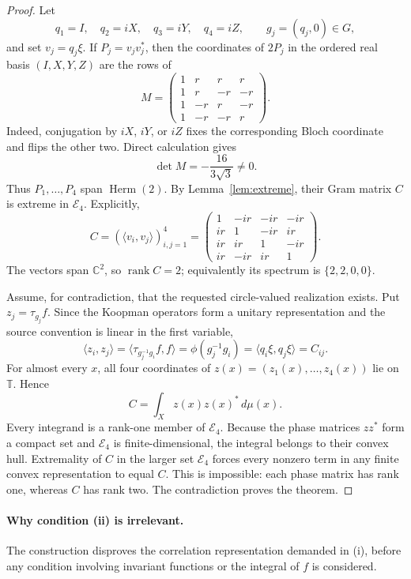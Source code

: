 \documentclass[11pt]{article}
\newcommand{\T}{\mathbb T}
\newcommand{\C}{\mathbb C}
\newcommand{\Herm}{\operatorname{Herm}}
\begin{document}
\begin{proof}
Let
\[
 q_1=I,\quad q_2=iX,\quad q_3=iY,\quad q_4=iZ,
 \qquad g_j=(q_j,0)\in G,
\]
and set $v_j=q_j\xi$.  If $P_j=v_jv_j^*$, then the coordinates of $2P_j$ in
the ordered real basis $(I,X,Y,Z)$ are the rows of
\[
 M=\begin{pmatrix}
 1&r&r&r\\
 1&r&-r&-r\\
 1&-r&r&-r\\
 1&-r&-r&r
 \end{pmatrix}.
\]
Indeed, conjugation by $iX$, $iY$, or $iZ$ fixes the corresponding Bloch
coordinate and flips the other two.  Direct calculation gives
\[
 \det M=-\frac{16}{3\sqrt3}\neq0.
\]
Thus $P_1,\dots,P_4$ span $\Herm(2)$.  By
Lemma~\ref{lem:extreme}, their Gram matrix $C$ is extreme in $\mathcal E_4$.
Explicitly,
\[
 C=(\langle v_i,v_j\rangle)_{i,j=1}^4
 =\begin{pmatrix}
 1&-ir&-ir&-ir\\
 ir&1&-ir&ir\\
 ir&ir&1&-ir\\
 ir&-ir&ir&1
 \end{pmatrix}.
\]
The vectors span $\C^2$, so $\operatorname{rank}C=2$; equivalently its
spectrum is $\{2,2,0,0\}$.

Assume, for contradiction, that the requested circle-valued realization
exists.  Put $z_j=\tau_{g_j}f$.  Since the Koopman operators form a unitary
representation and the source convention is linear in the first variable,
\[
 \langle z_i,z_j\rangle
 =\langle\tau_{g_j^{-1}g_i}f,f\rangle
 =\phi(g_j^{-1}g_i)
 =\langle q_i\xi,q_j\xi\rangle=C_{ij}.
\]
For almost every $x$, all four coordinates of
$z(x)=(z_1(x),\dots,z_4(x))$ lie on $\T$.  Hence
\[
 C=\int_X z(x)z(x)^*\,d\mu(x).
\]
Every integrand is a rank-one member of $\mathcal E_4$.  Because the phase
matrices $zz^*$ form a compact set and $\mathcal E_4$ is finite-dimensional,
the integral belongs to their convex hull.  Extremality of $C$ in the larger
set $\mathcal E_4$ forces every nonzero term in any finite convex
representation to equal $C$.  This is impossible: each phase matrix has rank
one, whereas $C$ has rank two.  The contradiction proves the theorem.
\end{proof}

\paragraph{Why condition (ii) is irrelevant.}
The construction disproves the correlation representation demanded in (i),
before any condition involving invariant functions or the integral of $f$ is
considered.
\end{document}
